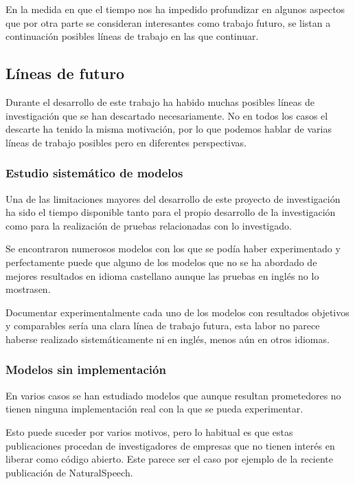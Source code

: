 En la medida en que el tiempo nos ha impedido profundizar en algunos aspectos que por otra parte se consideran interesantes como trabajo futuro, se listan a continuación posibles líneas de trabajo en las que continuar.

\subsection{Líneas de futuro}

Durante el desarrollo de este trabajo ha habido muchas posibles líneas de investigación que se han descartado necesariamente. No en todos los casos el descarte ha tenido la misma motivación, por lo que podemos hablar de varias líneas de trabajo posibles pero en diferentes perspectivas.

\subsubsection{Estudio sistemático de modelos}

Una de las limitaciones mayores del desarrollo de este proyecto de investigación ha sido el tiempo disponible tanto para el propio desarrollo de la investigación como para la realización de pruebas relacionadas con lo investigado.

Se encontraron numerosos modelos con los que se podía haber experimentado y perfectamente puede que alguno de los modelos que no se ha abordado de mejores resultados en idioma castellano aunque las pruebas en inglés no lo mostrasen.

Documentar experimentalmente cada uno de los modelos con resultados objetivos y comparables sería una clara línea de trabajo futura, esta labor no parece haberse realizado sistemáticamente ni en inglés, menos aún en otros idiomas.

\subsubsection{Modelos sin implementación}

En varios casos se han estudiado modelos que aunque resultan prometedores no tienen ninguna implementación real con la que se pueda experimentar. 

Esto puede suceder por varios motivos, pero lo habitual es que estas publicaciones procedan de investigadores de empresas que no tienen interés en liberar como código abierto. Este parece ser el caso por ejemplo de la reciente publicación de NaturalSpeech.

